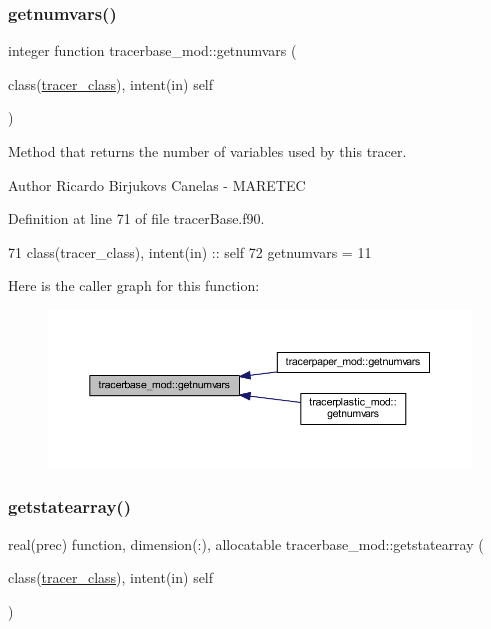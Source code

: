 \subsubsection{\texorpdfstring{getnumvars()}{getnumvars()}}
{\footnotesize\ttfamily integer function tracerbase\+\_\+mod\+::getnumvars (\begin{DoxyParamCaption}\item[{class(\mbox{\hyperlink{structtracerbase__mod_1_1tracer__class}{tracer\+\_\+class}}), intent(in)}]{self }\end{DoxyParamCaption})\hspace{0.3cm}{\ttfamily [private]}}



Method that returns the number of variables used by this tracer. 

\begin{DoxyAuthor}{Author}
Ricardo Birjukovs Canelas -\/ M\+A\+R\+E\+T\+EC 
\end{DoxyAuthor}


Definition at line 71 of file tracer\+Base.\+f90.


\begin{DoxyCode}
71     \textcolor{keywordtype}{class}(tracer\_class), \textcolor{keywordtype}{intent(in)} :: self
72     getnumvars = 11
\end{DoxyCode}
Here is the caller graph for this function\+:\nopagebreak
\begin{figure}[H]
\begin{center}
\leavevmode
\includegraphics[width=350pt]{namespacetracerbase__mod_a0be55b393be0846cbbe6be9feb3bb539_icgraph}
\end{center}
\end{figure}
\mbox{\label{namespacetracerbase__mod_adbdd85bd57f1a9debbe7b682099afb1d}} 
\subsubsection{\texorpdfstring{getstatearray()}{getstatearray()}}
{\footnotesize\ttfamily real(prec) function, dimension(\+:), allocatable tracerbase\+\_\+mod\+::getstatearray (\begin{DoxyParamCaption}\item[{class(\mbox{\hyperlink{structtracerbase__mod_1_1tracer__class}{tracer\+\_\+class}}), intent(in)}]{self }\end{DoxyParamCaption})\hspace{0.3cm}{\ttfamily [private]}}



